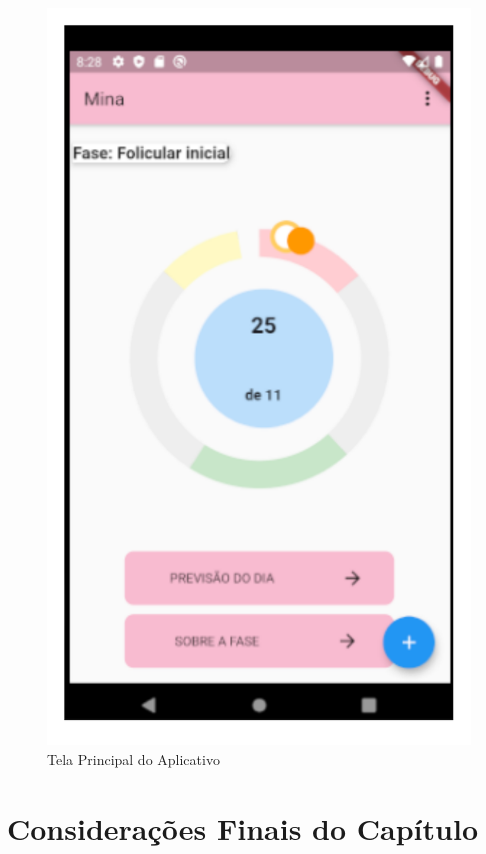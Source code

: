 \begin{figure}[ht]
	\centering
	\includegraphics[keepaspectratio=true,scale=0.6]{figuras/apk1.pdf}
	\caption{Tela Principal do Aplicativo}
        \label{fig12}
\end{figure}

\section{Considerações Finais do Capítulo}

